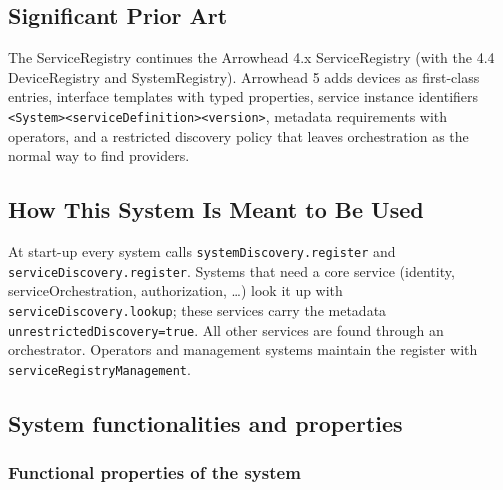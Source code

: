 \documentclass[a4paper]{arrowhead}
\begin{document}
\newpage

\subsection{Significant Prior Art}
\label{sec:prior_art}

The ServiceRegistry continues the Arrowhead 4.x ServiceRegistry (with the 4.4 DeviceRegistry and SystemRegistry). Arrowhead 5 adds devices as first-class entries, interface templates with typed properties, service instance identifiers \texttt{\textless{}System\textgreater{}\textbar{}\allowbreak{}\textless{}service\allowbreak{}Definition\textgreater{}\textbar{}\allowbreak{}\textless{}version\textgreater{}}, metadata requirements with operators, and a restricted discovery policy that leaves orchestration as the normal way to find providers.

\subsection{How This System Is Meant to Be Used}
\label{sec:use}

At start-up every system calls \texttt{system\allowbreak{}Discovery.\allowbreak{}register} and \texttt{service\allowbreak{}Discovery.\allowbreak{}register}. Systems that need a core service (identity, service\allowbreak{}Orchestration, authorization, \ldots{}) look it up with \texttt{service\allowbreak{}Discovery.\allowbreak{}lookup}; these services carry the metadata \texttt{unrestricted\allowbreak{}Discovery=\allowbreak{}true}. All other services are found through an orchestrator. Operators and management systems maintain the register with \texttt{service\allowbreak{}Registry\allowbreak{}Management}.

\subsection{System functionalities and properties}
\label{sec:properties}

\subsubsection{Functional properties of the system}
\end{document}
